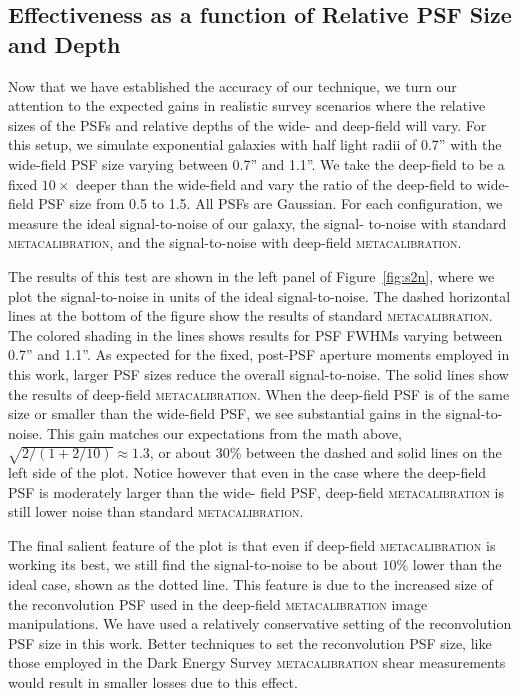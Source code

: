 \documentclass[twocolumn]{openjournal}
\makeatletter
\newcommand{\mcal}{\textsc{metacalibration}\@\xspace}
\makeatother
\begin{document}
\subsection{Effectiveness as a function of Relative PSF Size and Depth}\label{sec:sizedepth}

Now that we have established the accuracy of our technique, we turn our attention to the
expected gains in realistic survey scenarios where the relative sizes of the PSFs and
relative depths of the wide- and deep-field will vary. For this setup, we simulate
exponential galaxies with half light radii of 0.7'' with the wide-field PSF size varying
between 0.7'' and 1.1''. We take the deep-field to be a fixed $10\times$ deeper than the
wide-field and vary the ratio of the deep-field to wide-field PSF size from 0.5 to 1.5.
All PSFs are Gaussian. For each configuration, we measure the ideal signal-to-noise of
our galaxy, the signal- to-noise with standard \mcal, and the signal-to-noise with
deep-field \mcal.

The results of this test are shown in the left panel of Figure~\ref{fig:s2n}, where we
plot the signal-to-noise in units of the ideal signal-to-noise. The dashed horizontal
lines at the bottom of the figure show the results of standard \mcal. The colored
shading in the lines shows results for PSF FWHMs varying between 0.7'' and 1.1''. As
expected for the fixed, post-PSF aperture moments employed in this work, larger PSF
sizes reduce the overall signal-to-noise. The solid lines show the results of deep-field
\mcal. When the deep-field PSF is of the same size or smaller than the wide-field PSF,
we see substantial gains in the signal-to-noise. This gain matches our expectations from
the math above, $\sqrt{2/(1 + 2/10)}\approx1.3$, or about 30\% between the dashed and
solid lines on the left side of the plot. Notice however that even in the case where the
deep-field PSF is moderately larger than the wide- field PSF, deep-field \mcal is still
lower noise than standard \mcal.

The final salient feature of the plot is that even if deep-field \mcal is working its
best, we still find the signal-to-noise to be about $10\%$ lower than the ideal case,
shown as the dotted line. This feature is due to the increased size of the reconvolution
PSF used in the deep-field \mcal image manipulations. We have used a relatively
conservative setting of the reconvolution PSF size in this work. Better techniques to
set the reconvolution PSF size, like those employed in the Dark Energy Survey \mcal
shear measurements \citep{desy3shear} would result in smaller losses due to this effect.
\end{document}
